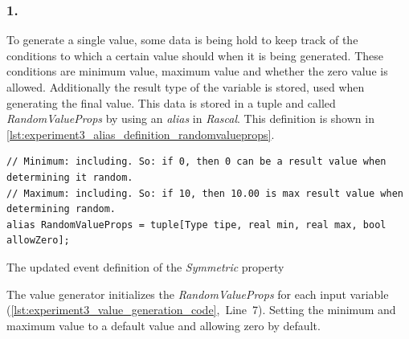 \subsubsection{1. }
To generate a single value, some data is being hold to keep track of the conditions to which a certain value should when it is being generated. These conditions are minimum value, maximum value and whether the zero value is allowed. Additionally the result type of the variable is stored, used when generating the final value. This data is stored in a tuple and called \textit{RandomValueProps} by using an \textit{alias} in \textit{Rascal}. This definition is shown in \autoref{lst:experiment3_alias_definition_randomvalueprops}.
\FloatBarrier
\begin{sourcecode}[!ht]
\begin{lstlisting}[language=Rascal]
// Minimum: including. So: if 0, then 0 can be a result value when determining it random.
// Maximum: including. So: if 10, then 10.00 is max result value when determining random.
alias RandomValueProps = tuple[Type tipe, real min, real max, bool allowZero];
\end{lstlisting}
\caption{The updated event definition of the \textit{Symmetric} property}
\label{lst:experiment3_alias_definition_randomvalueprops}
\end{sourcecode}
\FloatBarrier
The value generator initializes the \textit{RandomValueProps} for each input variable (\autoref{lst:experiment3_value_generation_code},~Line~7). Setting the minimum and maximum value to a default value and allowing zero by default.


